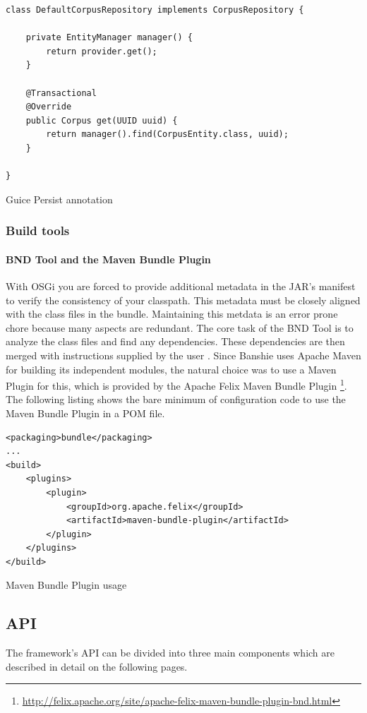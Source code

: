 \begin{listing}[H]
\begin{verbatim}
class DefaultCorpusRepository implements CorpusRepository {

    private EntityManager manager() {
        return provider.get();
    }

    @Transactional
    @Override
    public Corpus get(UUID uuid) {
        return manager().find(CorpusEntity.class, uuid);
    }

}
\end{verbatim}
\caption{Guice Persist annotation}
\end{listing}

\subsubsection{Build tools}
\paragraph{BND Tool and the Maven Bundle Plugin}
With \gls{OSGi} you are forced to provide additional metadata in the JAR's manifest to verify the consistency of your classpath. This metadata must be closely aligned with the class files in the bundle. Maintaining this metdata is an error prone chore because many aspects are redundant. The core task of the BND Tool is to analyze the class files and find any dependencies. These dependencies are then merged with instructions supplied by the user \cite{BND}. Since Banshie uses Apache Maven for building its independent modules, the natural choice was to use a Maven Plugin for this, which is provided by the Apache Felix Maven Bundle Plugin \footnote{\url{http://felix.apache.org/site/apache-felix-maven-bundle-plugin-bnd.html}}. The following listing shows the bare minimum of configuration code to use the Maven Bundle Plugin in a POM file.

\begin{listing}[H]
\begin{verbatim}
<packaging>bundle</packaging>
...
<build>
    <plugins>
        <plugin>
            <groupId>org.apache.felix</groupId>
            <artifactId>maven-bundle-plugin</artifactId>
        </plugin>
    </plugins>
</build>
\end{verbatim}
\caption{Maven Bundle Plugin usage}
\end{listing}

\newpage
\subsection{API}
The framework's \gls{API} can be divided into three main components which are described in detail on the following pages.

